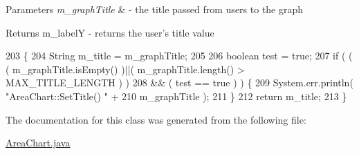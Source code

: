 \begin{DoxyParams}{Parameters}
{\em m\-\_\-graph\-Title} & -\/ the title passed from users to the graph \\
\hline
\end{DoxyParams}
\begin{DoxyReturn}{Returns}
m\-\_\-label\-Y -\/ returns the user's title value 
\end{DoxyReturn}

\begin{DoxyCode}
203                                                   \{
204         String m\_title = m\_graphTitle;
205         
206         \textcolor{keywordtype}{boolean} test = \textcolor{keyword}{true};
207         \textcolor{keywordflow}{if} ( ( ( m\_graphTitle.isEmpty() )||( m\_graphTitle.length() > MAX\_TITLE\_LENGTH ) ) 
208                  && ( test == true ) ) \{
209             System.err.println( \textcolor{stringliteral}{"AreaChart::SetTitle() "} + 
210                                 m\_graphTitle );
211         \}   
212         \textcolor{keywordflow}{return} m\_title;
213     \} 
\end{DoxyCode}


The documentation for this class was generated from the following file\-:\begin{DoxyCompactItemize}
\item 
\hyperlink{_area_chart_8java}{Area\-Chart.\-java}\end{DoxyCompactItemize}
